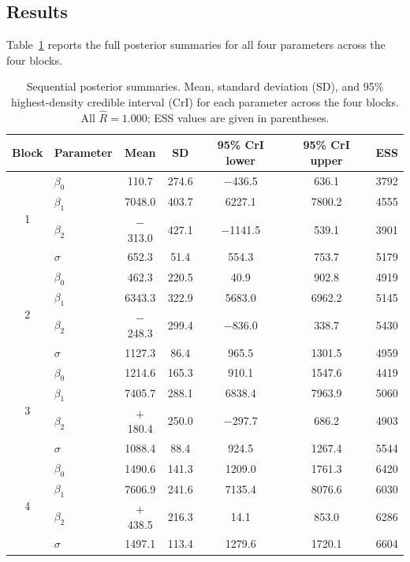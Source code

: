 \subsection{Results}

Table~\ref{tab:seq_posterior} reports the full posterior summaries for all four
parameters across the four blocks.

\begin{table}[htbp]
\centering
\caption{Sequential posterior summaries. Mean, standard deviation (SD), and
95\% highest-density credible interval (CrI) for each parameter across the four
blocks. All $\hat{R} = 1.000$; ESS values are given in parentheses.}
\label{tab:seq_posterior}
\small
\begin{tabular}{clccccc}
\hline
Block & Parameter & Mean & SD & 95\% CrI lower & 95\% CrI upper & ESS \\
\hline
\multirow{4}{*}{1} 
  & $\beta_0$ &   110.7 & 274.6 & $-$436.5 &   636.1 & 3792 \\
  & $\beta_1$ &  7048.0 & 403.7 &  6227.1  &  7800.2 & 4555 \\
  & $\beta_2$ &  $-$313.0 & 427.1 & $-$1141.5 &   539.1 & 3901 \\
  & $\sigma$  &   652.3 &  51.4 &   554.3  &   753.7 & 5179 \\
\hline
\multirow{4}{*}{2}
  & $\beta_0$ &   462.3 & 220.5 &    40.9  &   902.8 & 4919 \\
  & $\beta_1$ &  6343.3 & 322.9 &  5683.0  &  6962.2 & 5145 \\
  & $\beta_2$ &  $-$248.3 & 299.4 &  $-$836.0 &   338.7 & 5430 \\
  & $\sigma$  &  1127.3 &  86.4 &   965.5  &  1301.5 & 4959 \\
\hline
\multirow{4}{*}{3}
  & $\beta_0$ &  1214.6 & 165.3 &   910.1  &  1547.6 & 4419 \\
  & $\beta_1$ &  7405.7 & 288.1 &  6838.4  &  7963.9 & 5060 \\
  & $\beta_2$ &  $+$180.4 & 250.0 &  $-$297.7 &   686.2 & 4903 \\
  & $\sigma$  &  1088.4 &  88.4 &   924.5  &  1267.4 & 5544 \\
\hline
\multirow{4}{*}{4}
  & $\beta_0$ &  1490.6 & 141.3 &  1209.0  &  1761.3 & 6420 \\
  & $\beta_1$ &  7606.9 & 241.6 &  7135.4  &  8076.6 & 6030 \\
  & $\beta_2$ &  $+$438.5 & 216.3 &    14.1  &   853.0 & 6286 \\
  & $\sigma$  &  1497.1 & 113.4 &  1279.6  &  1720.1 & 6604 \\
\hline
\end{tabular}
\end{table}

